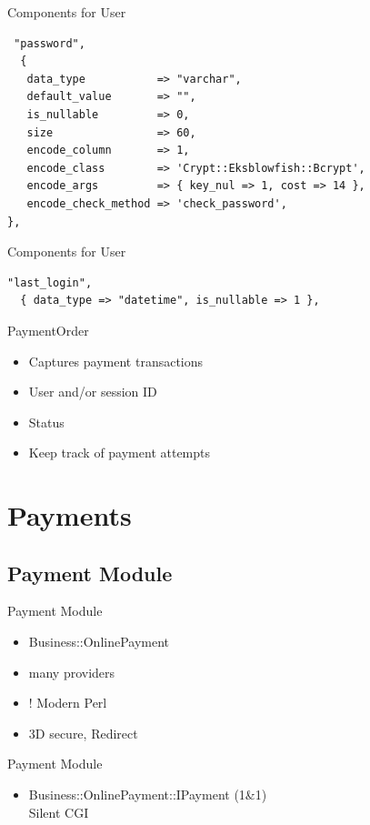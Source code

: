 \begin{frame}[fragile]{Components for User}
\begin{lstlisting}
 "password",
  {
   data_type           => "varchar",
   default_value       => "",
   is_nullable         => 0,
   size                => 60, 
   encode_column       => 1,
   encode_class        => 'Crypt::Eksblowfish::Bcrypt',
   encode_args         => { key_nul => 1, cost => 14 },
   encode_check_method => 'check_password',
},
\end{lstlisting}
\end{frame}

\begin{frame}[fragile]{Components for User}
\begin{lstlisting}
"last_login",
  { data_type => "datetime", is_nullable => 1 },
\end{lstlisting}
\end{frame}

\begin{frame}{PaymentOrder}
\begin{itemize}
 \item Captures payment transactions
 \item User and/or session ID
 \item Status
 \item Keep track of payment attempts
\end{itemize}
\end{frame}

\section{Payments}
\subsection{Payment Module}
\begin{frame}{Payment Module}
\begin{itemize}
\item Business::OnlinePayment
\item many providers
\item ! Modern Perl
\item 3D secure, Redirect
\end{itemize}
\end{frame}

\begin{frame}{Payment Module}
\begin{itemize}
\item Business::OnlinePayment::IPayment (1\&1) \\
Silent CGI
\end{itemize}
\end{frame}

